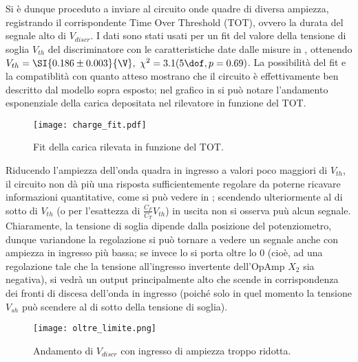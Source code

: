 Si è dunque proceduto a inviare al circuito onde quadre di diversa ampiezza, registrando il corrispondente Time Over Threshold (TOT), ovvero la durata del segnale alto di $V_{discr}$. I dati sono stati usati per un fit del valore della tensione di soglia $V_{th}$ del discriminatore con le caratteristiche date dalle misure in , ottenendo $V_{th} = \SI{0.186 \pm 0.003}{\V}, \ \chi^2 = 3.1 (5 \dof, p=  0.69)$. La possibilità del fit e la compatiblità con quanto atteso mostrano che il circuito è effettivamente ben descritto dal modello sopra esposto; nel grafico in  si può notare l'andamento esponenziale della carica depositata nel rilevatore in funzione del TOT.

\begin{figure}[h]
	\centering
	\texttt{[image: charge\_fit.pdf]}
	\caption{Fit della carica rilevata in funzione del TOT.}
	\label{f:fit_q}
\end{figure}

Riducendo l'ampiezza dell'onda quadra in ingresso a valori poco maggiori di $V_{th}$, il circuito non dà più una risposta sufficientemente regolare da poterne ricavare informazioni quantitative, come si può vedere in ; scendendo ulteriormente al di sotto di $V_{th}$ (o per l'esattezza di $\frac{C_F}{C_T} V_{th}$) in uscita non si osserva puù alcun segnale.
Chiaramente, la tensione di soglia dipende dalla posizione del potenziometro, dunque variandone la regolazione si può tornare a vedere un segnale anche con ampiezza in ingresso più bassa; se invece lo si porta oltre lo 0 (cioè, ad una regolazione tale che la tensione all'ingresso invertente dell'OpAmp $X_2$ sia negativa), si vedrà un output principalmente alto che scende in corrispondenza dei fronti di discesa dell'onda in ingresso (poiché solo in quel momento la tensione $V_{sh}$ può scendere al di sotto della tensione di soglia).

\begin{figure}[h]
	\centering
	\texttt{[image: oltre\_limite.png]}
	\caption{Andamento di $V_{discr}$ con ingresso di ampiezza troppo ridotta.}
	\label{f:det_limit}
\end{figure}
